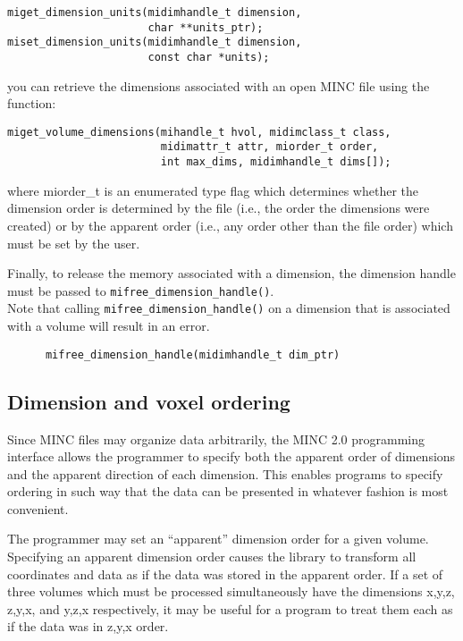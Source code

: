 \documentclass{article}
\begin{document}
\begin{verbatim}
miget_dimension_units(midimhandle_t dimension, 
                      char **units_ptr);
miset_dimension_units(midimhandle_t dimension, 
                      const char *units);
\end{verbatim}

you can retrieve the dimensions associated with an open MINC file using
the function:\\

\begin{verbatim}
miget_volume_dimensions(mihandle_t hvol, midimclass_t class,
                        midimattr_t attr, miorder_t order,
                        int max_dims, midimhandle_t dims[]);
\end{verbatim}
   
where miorder\_t is an enumerated type flag which determines whether the
dimension order is determined by the file (i.e., the order the dimensions
were created) or by the apparent order (i.e., any order other than the file
order) which must be set by the user.       
     
Finally, to release the memory associated with a dimension, 
the dimension handle must be passed to {\tt mifree\_dimension\_handle()}.\\
Note that calling {\tt mifree\_dimension\_handle()} on a 
dimension that is associated with a volume will result in an error. 

\begin{verbatim}
      mifree_dimension_handle(midimhandle_t dim_ptr)
\end{verbatim}
\subsection{Dimension and voxel ordering}
Since MINC files may organize data arbitrarily, the MINC 2.0
programming interface allows the programmer to specify both the
apparent order of dimensions and the apparent direction of each
dimension.  This enables programs to specify ordering in such way 
that the data can be presented in whatever fashion is most convenient.

The programmer may set an ``apparent'' dimension order for a given
volume.  Specifying an apparent dimension order causes the library to
transform all coordinates and data as if the data was stored in the
apparent order. If a set of three volumes which must be processed
simultaneously have the dimensions x,y,z, z,y,x, and y,z,x
respectively, it may be useful for a program to treat them each as if
the data was in z,y,x order.
\end{document}
